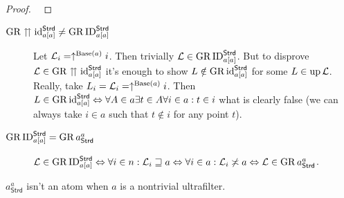 \begin{proof}
~\end{proof}
\begin{description}
\item [{$\operatorname{GR}\upuparrows\operatorname{id}_{a[a]}^{\mathsf{Strd}}\neq\operatorname{GR}\operatorname{ID}_{a[a]}^{\mathsf{Strd}}$}] Let
$\mathcal{L}_{i}=\uparrow^{\operatorname{Base}(a)}i$. Then trivially $\mathcal{L}\in\operatorname{GR}\operatorname{ID}_{a[a]}^{\mathsf{Strd}}$.
But to disprove $\mathcal{L}\in\operatorname{GR}\upuparrows\operatorname{id}_{a[a]}^{\mathsf{Strd}}$
it's enough to show $L\notin\operatorname{GR}\operatorname{id}_{a[a]}^{\mathsf{Strd}}$ for some
$L\in\operatorname{up}\mathcal{L}$. Really, take $L_{i}=\mathcal{L}_{i}=\uparrow^{\operatorname{Base}(a)}i$.
Then $L\in\operatorname{GR}\operatorname{id}_{a[a]}^{\mathsf{Strd}}\Leftrightarrow\forall A\in a\exists t\in A\forall i\in a:t\in i$
what is clearly false (we can always take $i\in a$ such that $t\notin i$
for any point $t$).
\item [{$\operatorname{GR}\operatorname{ID}_{a[a]}^{\mathsf{Strd}}=\operatorname{GR} a_{\mathsf{Strd}}^{a}$}] $\mathcal{L}\in\operatorname{GR}\operatorname{ID}_{a[a]}^{\mathsf{Strd}}\Leftrightarrow\forall i\in n:\mathcal{L}_{i}\sqsupseteq a\Leftrightarrow\forall i\in a:\mathcal{L}_{i}\not\asymp a\Leftrightarrow\mathcal{L}\in\operatorname{GR} a_{\mathsf{Strd}}^{a}$.\end{description}
\begin{cor}
$a_{\mathsf{Strd}}^{a}$ isn't an atom when $a$ is a nontrivial ultrafilter.
\end{cor}

